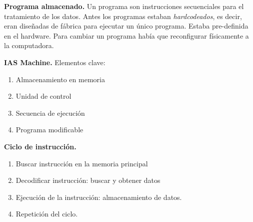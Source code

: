 \documentclass{article}
\begin{document}
\textbf{Programa almacenado.} Un programa son instrucciones secuenciales para el
tratamiento de los datos. Antes los programas estaban \textit{hardcodeados}, es
decir, eran diseñadas de fábrica para ejecutar un único programa. Estaba
pre-definida en el hardware. Para cambiar un programa había que reconfigurar
físicamente a la computadora. 

\textbf{IAS Machine.} Elementos clave:
\begin{enumerate}
    \item Almacenamiento en memoria
    \item Unidad de control
    \item Secuencia de ejecución
    \item Programa modificable
\end{enumerate}

\textbf{Ciclo de instrucción.}
\begin{enumerate}
    \item Buscar instrucción en la memoria principal
    \item Decodificar instrucción: buscar y obtener datos
    \item Ejecución de la instrucción: almacenamiento de datos.
    \item Repetición del ciclo.
\end{enumerate}
\end{document}
